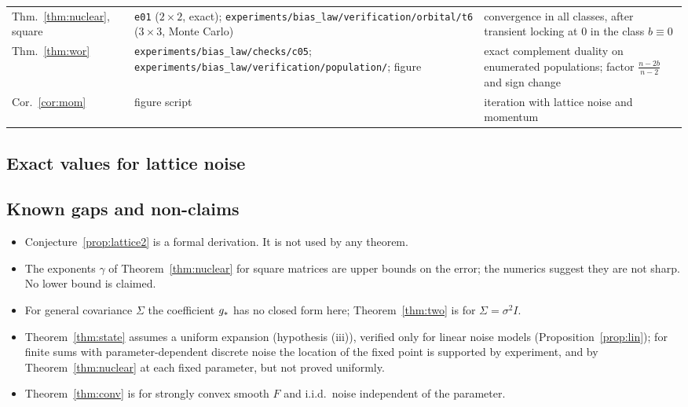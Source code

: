 {\begin{longtable}{@{}p{}p{}p{}@{}}
Thm.~\ref{thm:nuclear}, square & \texttt{e01} ($2\times2$, exact); \texttt{experiments/bias\_law/verification/orbital/t6} ($3\times3$, Monte Carlo) & convergence in all classes, after transient locking at $0$ in the class $b\equiv0$\\
Thm.~\ref{thm:wor} & \texttt{experiments/bias\_law/checks/c05}; \texttt{experiments/bias\_law/verification/population/}; figure & exact complement duality on enumerated populations; factor $\frac{n-2b}{n-2}$ and sign change\\
Cor.~\ref{cor:mom} & figure script & iteration with lattice noise and momentum\\
\bottomrule
\end{longtable}}

\subsection{Exact values for lattice noise}
\begin{table}[h]\centering\small
{}
\caption{Scaled bias $b\,G_b^\st$ for i.i.d.\ entries in $\{-1,2\}$ with probabilities $\frac23,\frac13$ at the largest batch
size computed in each residue class, and the prediction $\gs$.}\label{tab:exact}
\end{table}

\subsection{Known gaps and non-claims}
\begin{itemize}\setlength\itemsep{2pt}
\item Conjecture~\ref{prop:lattice2} is a formal derivation. It is not used by any theorem.
\item The exponents $\gamma$ of Theorem~\ref{thm:nuclear} for square matrices are upper bounds on the error; the numerics
suggest they are not sharp. No lower bound is claimed.
\item For general covariance $\Sigma$ the coefficient $\gs$ has no closed form here; Theorem~\ref{thm:two} is for
$\Sigma=\sigma^2I$.
\item Theorem~\ref{thm:state} assumes a uniform expansion (hypothesis (iii)), verified only for linear noise models
(Proposition~\ref{prop:lin}); for finite sums with parameter-dependent discrete noise the location of the fixed point
is supported by experiment, and by Theorem~\ref{thm:nuclear} at each fixed parameter, but not proved uniformly.
\item Theorem~\ref{thm:conv} is for strongly convex smooth $F$ and i.i.d.\ noise independent of the parameter.
\end{itemize}
